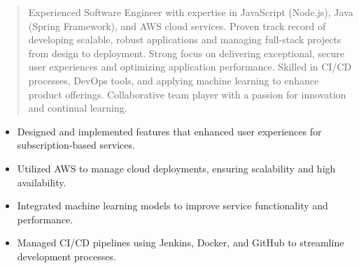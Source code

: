



\makecvheader

\begin{quote}
  \noindent
  Experienced Software Engineer with expertise in JavaScript (Node.js), Java (Spring Framework), and AWS cloud services. Proven track record of developing scalable, robust applications and managing full-stack projects from design to deployment. Strong focus on delivering exceptional, secure user experiences and optimizing application performance. Skilled in CI/CD processes, DevOps tools, and applying machine learning to enhance product offerings. Collaborative team player with a passion for innovation and continual learning.
\end{quote}

\par\smallskip
\noindent
\begin{minipage}{20cm}
  \begin{minipage}{9.75cm}
    \begin{itemize}
      \item Designed and implemented features that enhanced user experiences for subscription-based services.
      \item Utilized AWS to manage cloud deployments, ensuring scalability and high availability.
    \end{itemize}
  \end{minipage}
  \hfill
  \begin{minipage}{9.75cm}
    \begin{itemize}
      \item Integrated machine learning models to improve service functionality and performance.
      \item Managed CI/CD pipelines using Jenkins, Docker, and GitHub to streamline development processes.
    \end{itemize}
  \end{minipage}
\end{minipage}
\par\smallskip
\divider


